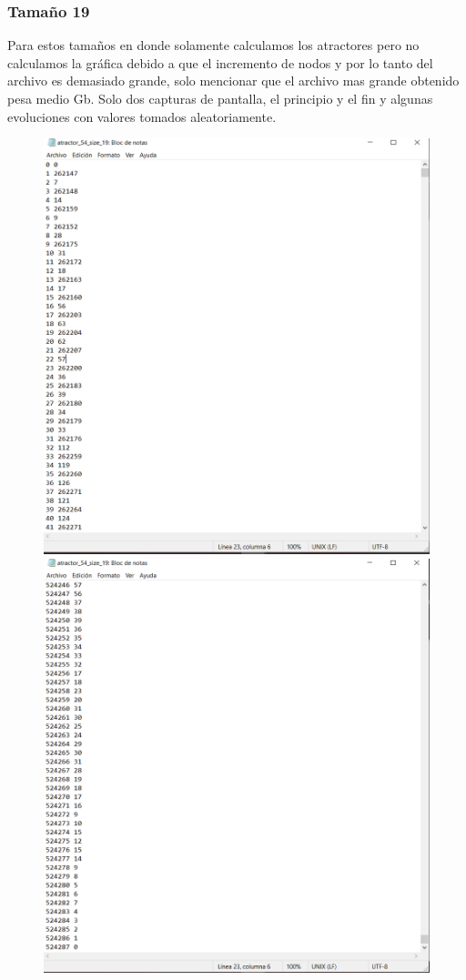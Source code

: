 \documentclass[11pt]{article}
\begin{document}
			\subsubsection{Tamaño 19}
			Para estos tamaños en donde solamente calculamos los atractores pero no calculamos la gráfica debido a que el incremento de nodos y por lo tanto del archivo es demasiado grande, solo mencionar que el archivo mas grande obtenido pesa medio Gb. Solo dos capturas de pantalla, el principio y el fin y algunas evoluciones con valores tomados aleatoriamente.
			\begin{figure}[H]
			\centering
			\includegraphics[scale=0.3]{resources/Atractores54/atractor_54_size_19.png}
			\includegraphics[scale=0.3]{resources/Atractores54/atractor_54_size_191.png}

\end{figure}
\end{document}
